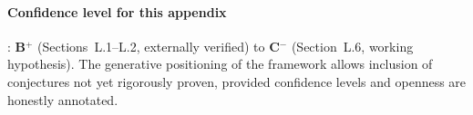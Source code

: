 \paragraph{Confidence level for this appendix}: \textbf{B$^+$} (Sections~L.1--L.2, externally verified) to \textbf{C$^-$} (Section~L.6, working hypothesis). The generative positioning of the framework allows inclusion of conjectures not yet rigorously proven, provided confidence levels and openness are honestly annotated.
